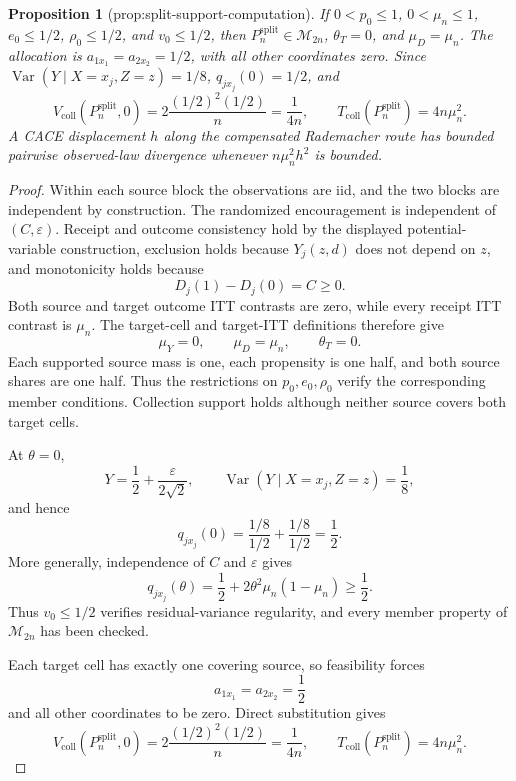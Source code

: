 \documentclass{article}
\newtheorem{proposition}{Proposition}
\begin{document}
\begin{proposition}[prop:split-support-computation]\label{prop:split-support-computation}
If \(0<p_0\le1\), \(0<\mu_n\le1\), \(e_0\le1/2\), \(\rho_0\le1/2\), and \(v_0\le1/2\), then \(P_n^{\mathrm{split}}\in\mathcal M_{2n}\), \(\theta_T=0\), and \(\mu_D=\mu_n\). The allocation is \(a_{1x_1}=a_{2x_2}=1/2\), with all other coordinates zero. Since \(\operatorname{Var}(Y\mid X=x_j,Z=z)=1/8\), \(q_{jx_j}(0)=1/2\), and \[V_{\mathrm{coll}}(P_n^{\mathrm{split}},0)=2\frac{(1/2)^2(1/2)}{n}=\frac1{4n},\qquad T_{\mathrm{coll}}(P_n^{\mathrm{split}})=4n\mu_n^2.\] A CACE displacement \(h\) along the compensated Rademacher route has bounded pairwise observed-law divergence whenever \(n\mu_n^2h^2\) is bounded.
\end{proposition}
\begin{proof}
Within each source block the observations are iid, and the two blocks are independent by construction. The randomized encouragement is independent of \((C,\varepsilon)\). Receipt and outcome consistency hold by the displayed potential-variable construction, exclusion holds because \(Y_j(z,d)\) does not depend on \(z\), and monotonicity holds because
\[
 D_j(1)-D_j(0)=C\ge0.
\]
Both source and target outcome ITT contrasts are zero, while every receipt ITT contrast is \(\mu_n\). The target-cell and target-ITT definitions therefore give
\[
 \mu_Y=0,\qquad \mu_D=\mu_n,\qquad \theta_T=0.
\]
Each supported source mass is one, each propensity is one half, and both source shares are one half. Thus the restrictions on \(p_0,e_0,\rho_0\) verify the corresponding member conditions. Collection support holds although neither source covers both target cells.

At \(\theta=0\),
\[
 Y=\frac12+\frac{\varepsilon}{2\sqrt2},
 \qquad
 \operatorname{Var}(Y\mid X=x_j,Z=z)=\frac18,
\]
and hence
\[
 q_{jx_j}(0)=\frac{1/8}{1/2}+\frac{1/8}{1/2}=\frac12.
\]
More generally, independence of \(C\) and \(\varepsilon\) gives
\[
 q_{jx_j}(\theta)=\frac12+2\theta^2\mu_n(1-\mu_n)\ge\frac12.
\]
Thus \(v_0\le1/2\) verifies residual-variance regularity, and every member property of \(\mathcal M_{2n}\) has been checked.

Each target cell has exactly one covering source, so feasibility forces
\[
 a_{1x_1}=a_{2x_2}=\frac12
\]
and all other coordinates to be zero. Direct substitution gives
\[
 V_{\mathrm{coll}}(P_n^{\mathrm{split}},0)
 =2\frac{(1/2)^2(1/2)}n=\frac1{4n},
 \qquad
 T_{\mathrm{coll}}(P_n^{\mathrm{split}})=4n\mu_n^2.
\]


\end{proof}
\end{document}
